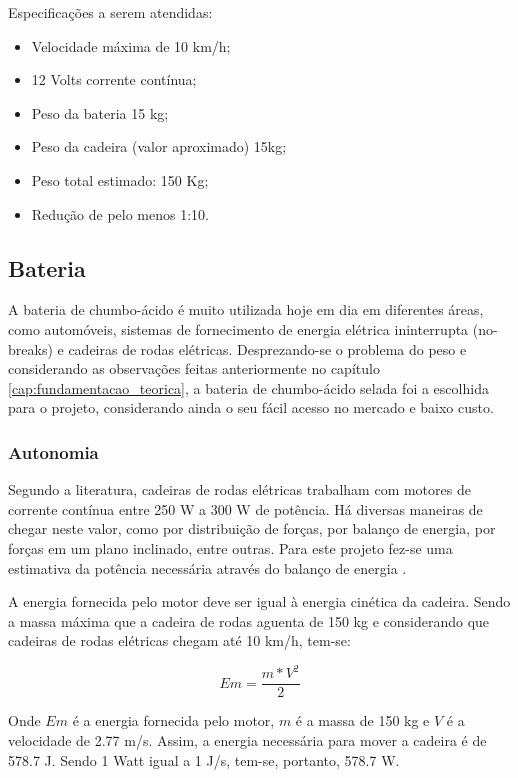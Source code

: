 Especificações a serem atendidas:

\begin{itemize}
  \item Velocidade máxima de 10 km/h;
  \item 12 Volts corrente contínua;
  \item Peso da bateria 15 kg;
  \item Peso da cadeira (valor aproximado) 15kg;
  \item Peso total estimado: 150 Kg;
  \item Redução de pelo menos 1:10.
\end{itemize}

\subsection{Bateria}

A bateria de chumbo-ácido é muito utilizada hoje em dia em diferentes áreas, como automóveis, sistemas de fornecimento de energia elétrica ininterrupta (no-breaks) e cadeiras de rodas elétricas. Desprezando-se o problema do peso e considerando as observações feitas anteriormente no capítulo \ref{cap:fundamentacao_teorica}, a bateria de chumbo-ácido selada foi a escolhida para o projeto, considerando ainda o seu fácil acesso no mercado e baixo custo.

\subsubsection{Autonomia}

Segundo a literatura, cadeiras de rodas elétricas trabalham com motores de corrente contínua entre 250 W a 300 W de potência. Há diversas maneiras de chegar neste valor, como por distribuição de forças, por balanço de energia, por forças em um plano inclinado, entre outras. Para este projeto fez-se uma estimativa da potência necessária através do balanço de energia \cite{acionamento_motores_cadeira}.

A energia fornecida pelo motor deve ser igual à energia cinética da cadeira. Sendo a massa máxima que a cadeira de rodas aguenta de 150 kg e considerando que cadeiras de rodas elétricas chegam até 10 km/h, tem-se:


\begin{equation}
  Em = \frac{m*V^2}{2}
\end{equation}

Onde $Em$ é a energia fornecida pelo motor, $m$ é a massa de 150 kg e $V$ é a velocidade de 2.77 m/s. Assim, a energia necessária para mover a cadeira é de 578.7 J. Sendo 1 Watt igual a 1 J/s, tem-se, portanto, 578.7 W.

